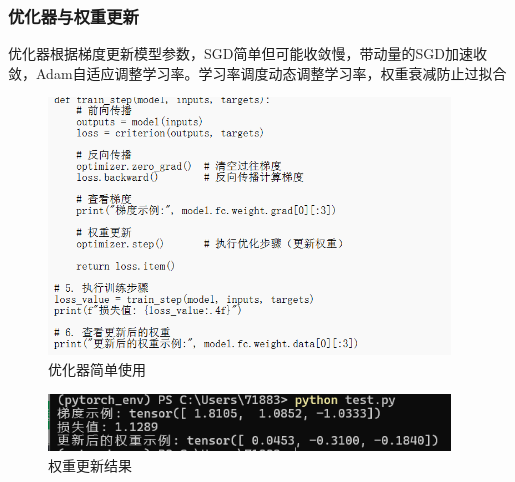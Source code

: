\documentclass[UTF8]{ctexart}
\begin{document}
\subsubsection{优化器与权重更新}
优化器根据梯度更新模型参数，SGD简单但可能收敛慢，带动量的SGD加速收敛，Adam自适应调整学习率。学习率调度动态调整学习率，权重衰减防止过拟合

\begin{figure}[H]
    \centering
    \includegraphics[width=0.95\textwidth]{picture/优化器简单使用.png}%
    \caption{优化器简单使用}
\end{figure}
\begin{figure}[H]
    \centering
    \includegraphics[width=0.95\textwidth]{picture/权重更新的简单使用.png}%
    \caption{权重更新结果}
\end{figure}
\end{document}
